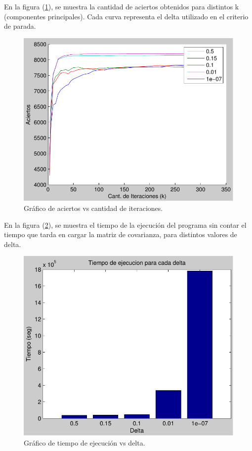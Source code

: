 

En la figura (\ref{fig:aciertos-vs-k}), se muestra la cantidad de aciertos obtenidos para distintos k (componentes principales). 
Cada curva representa el delta utilizado en el criterio de parada.


\begin{figure}[h]
\begin{center}
  \includegraphics[scale=0.8]{imagenes/aciertos.pdf}
\end{center}
\caption{Gráfico de aciertos vs cantidad de iteraciones.}
\label{fig:aciertos-vs-k}
\end{figure}

En la figura (\ref{fig:tiempo-vs-k}), se muestra el tiempo de la ejecución del programa sin contar el tiempo que tarda en
cargar la matriz de covarianza, para distintos valores de delta.

\begin{figure}[h]
\begin{center}
  \includegraphics[scale=0.8]{imagenes/tiempos.pdf}
\end{center}
\caption{Gráfico de tiempo de ejecución vs delta.}
\label{fig:tiempo-vs-k}
\end{figure}